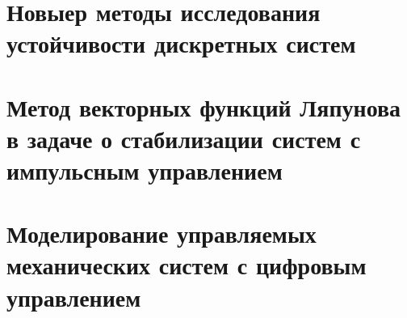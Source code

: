 \documentclass[14pt,a4paper,final,russian]{report}
\numberwithin{theorem}{chapter}
\numberwithin{lemma}{chapter}
\numberwithin{consectary}{chapter}
\numberwithin{pointout}{chapter}
\numberwithin{definition}{chapter}
\numberwithin{assertion}{chapter}
\begin{document}
\vglue 0.5cm

\dotfill\mbox{\ \ \pageref{postfix}} \vglue 0.5cm

 \dotfill\mbox{\ \ \pageref{bibl}}
\par \vglue 0.5cm
 \dotfill\mbox{\ \ \pageref{app1start}}

\newpage

\fontsize{14pt}{21pt}\selectfont
{}



\chapter{Новыер методы исследования устойчивости дискретных систем}


 

\chapter{Метод векторных функций Ляпунова в задаче о стабилизации систем с импульсным управлением}


 

\chapter{Моделирование управляемых механических систем с цифровым управлением}


 






\end{document}
